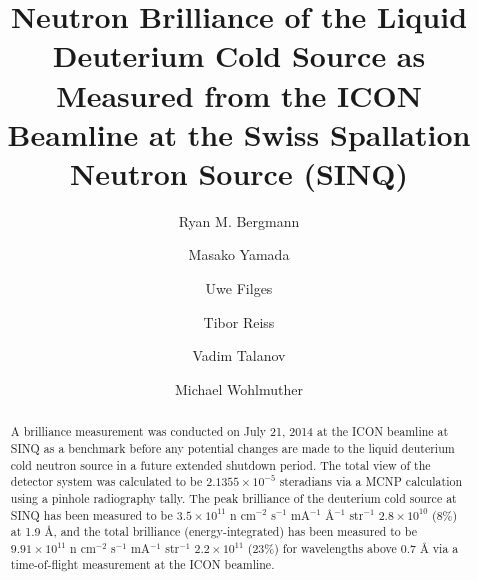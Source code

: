 \documentclass[5p,12pt]{elsarticle}
\begin{document}
\begin{frontmatter}



\title{Neutron Brilliance of the Liquid Deuterium Cold Source as Measured from the ICON Beamline at the Swiss Spallation Neutron Source (SINQ)}


\author[]{Ryan M. Bergmann}

\author[]{Masako Yamada}

\author[]{Uwe Filges}

\author[]{Tibor Reiss}

\author[]{Vadim Talanov}

\author[]{Michael Wohlmuther}

\address{Paul Scherrer Institut, Villigen, Switzerland}


\begin{abstract}

A brilliance measurement was conducted on July 21, 2014 at the ICON beamline at SINQ as a benchmark before any potential changes are made to the liquid deuterium cold neutron source in a future extended shutdown period. The total view of the detector system was calculated to be $2.1355\times10^{-5}$ steradians via a MCNP calculation using a pinhole radiography tally.  The peak brilliance of the deuterium cold source at SINQ has been measured to be $3.5\times10^{11}$ n cm$^{-2}$ s$^{-1}$ mA$^{-1}$ \AA$^{-1}$ str$^{-1}$ \pm $2.8\times10^{10}$ (8\%) at 1.9 {\AA}, and the total brilliance (energy-integrated) has been measured to be  $9.91\times10^{11}$  n cm$^{-2}$ s$^{-1}$ mA$^{-1}$ str$^{-1}$ \pm $2.2\times10^{11}$ (23\%) for wavelengths above 0.7 {\AA} via a time-of-flight measurement at the ICON beamline.


\end{abstract}
\end{frontmatter}
\end{document}
